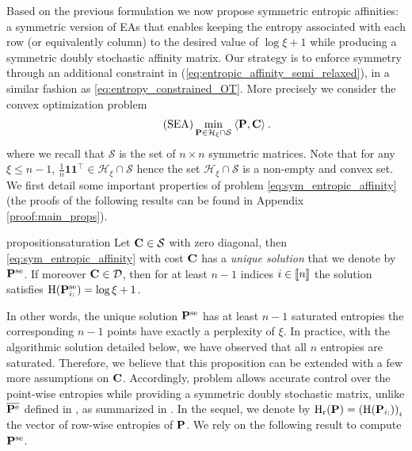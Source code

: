 Based on the previous formulation we now propose symmetric entropic affinities: a symmetric version of EAs that enables keeping the entropy associated with each row (or equivalently column) to the desired value of $\log \xi + 1$ while producing a symmetric doubly stochastic affinity matrix. Our strategy is to enforce symmetry through an additional constraint in (\ref{eq:entropic_affinity_semi_relaxed}), in a similar fashion as \eqref{eq:entropy_constrained_OT}. More precisely we consider the convex optimization problem
\begin{align}
\label{eq:sym_entropic_affinity}
\tag{SEA}
  \min_{\mathbf{P} \in \mathcal{H}_{\xi} \cap \mathcal{S}} \: \langle \mathbf{P}, \mathbf{C} \rangle \:. 
\end{align}
where we recall that $\mathcal{S}$ is the set of $n \times n$ symmetric matrices. Note that for any $\xi \leq n-1$, $\frac{1}{n} \bm{1}\bm{1}^\top \in \mathcal{H}_{\xi} \cap \mathcal{S}$ hence the set $\mathcal{H}_{\xi} \cap \mathcal{S}$ is a non-empty and convex set. We first detail some important properties of problem \eqref{eq:sym_entropic_affinity} (the proofs of the following results can be found in Appendix \ref{proof:main_props}).
\begin{restatable}{proposition}{saturation}
\label{prop:saturation_entropies}
Let $\mathbf{C} \in \mathcal{S}$ with zero diagonal, then \eqref{eq:sym_entropic_affinity} with cost $\mathbf{C}$ has a \emph{unique solution} that we denote by $\mathbf{P}^{\mathrm{se}}$. If moreover $\mathbf{C} \in \mathcal{D}$, then for at least $n-1$ indices $i \in {[\![n]\!]}$ the solution satisfies $\operatorname{H}(\mathbf{P}^{\mathrm{se}}_{i:}) = \log \xi + 1$.
\end{restatable}
In other words, the unique solution $\mathbf{P}^{\mathrm{se}}$ has at least $n-1$ saturated entropies \ie the corresponding $n-1$ points have exactly a perplexity of $\xi$. In practice, with the algorithmic solution detailed below, we have observed that all $n$ entropies are saturated. Therefore, we believe that this proposition can be extended with a few more assumptions on $\mathbf{C}$. Accordingly,
problem  allows accurate control over the point-wise entropies while providing a symmetric doubly stochastic matrix, unlike $\overline{\mathbf{P}^{\mathrm{e}}}$ defined in
, as summarized in . In the sequel, we denote by $\operatorname{H}_{\mathrm{r}}(\mathbf{P}) = \left( \operatorname{H}(\mathbf{P}_{i:}) \right)_{i}$ the vector of row-wise entropies of $\mathbf{P}$. We rely on the following result to compute $\mathbf{P}^{\mathrm{se}}$.
